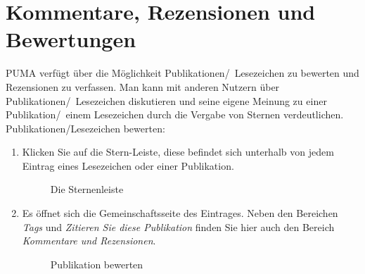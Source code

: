 \section{Kommentare, Rezensionen und Bewertungen}
\label{sec:kommentare}
PUMA verfügt über die Möglichkeit Publikationen/~Lesezeichen zu bewerten und Rezensionen zu verfassen. Man kann mit anderen Nutzern über Publikationen/~Lesezeichen diskutieren und seine eigene Meinung zu einer Publikation/~einem Lesezeichen durch die Vergabe von Sternen verdeutlichen.
\newline
\newline
Publikationen/Lesezeichen bewerten:
\begin{enumerate}
    \item Klicken Sie auf die Stern-Leiste, diese befindet sich unterhalb von jedem Eintrag eines Lesezeichen oder einer Publikation.
\begin{figure}[h!]
 \centering
 \caption{Die Sternenleiste}
 \label{fig:sternenleiste}
\end{figure}  
    \item Es öffnet sich die Gemeinschaftsseite des Eintrages. Neben den Bereichen \textit{Tags} und \textit{Zitieren Sie diese Publikation} finden Sie hier auch den Bereich \textit{Kommentare und Rezensionen}. 
\begin{figure}[h!]
 \centering
 \caption{Publikation bewerten}
 \label{fig:publikationBewerten}
\end{figure}

\end{enumerate}

